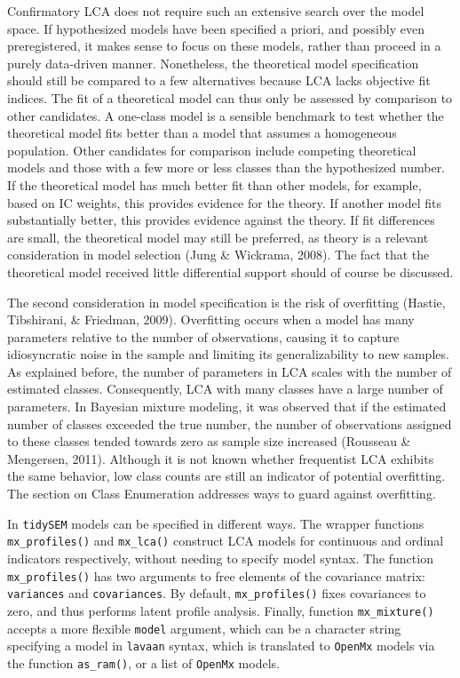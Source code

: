 \documentclass[
  ,man,floatsintext]{apa6}
\begin{document}
Confirmatory LCA does not require such an extensive search over the model space.
If hypothesized models have been specified a priori,
and possibly even preregistered,
it makes sense to focus on these models, rather than proceed in a purely data-driven manner.
Nonetheless, the theoretical model specification should still be compared to a few alternatives because LCA lacks objective fit indices.
The fit of a theoretical model can thus only be assessed by comparison to other candidates.
A one-class model is a sensible benchmark
to test whether the theoretical model fits better than a model that assumes a homogeneous population.
Other candidates for comparison include competing theoretical models and those with a few more or less classes than the hypothesized number.
If the theoretical model has much better fit than other models,
for example, based on IC weights,
this provides evidence for the theory.
If another model fits substantially better,
this provides evidence against the theory.
If fit differences are small, the theoretical model may still be preferred, as theory is a relevant consideration in model selection (Jung \& Wickrama, 2008).
The fact that the theoretical model received little differential support should of course be discussed.

The second consideration in model specification is the risk of overfitting (Hastie, Tibshirani, \& Friedman, 2009).
Overfitting occurs when a model has many parameters relative to the number of observations,
causing it to capture idiosyncratic noise in the sample and limiting its generalizability to new samples.
As explained before, the number of parameters in LCA scales with the number of estimated classes.
Consequently, LCA with many classes have a large number of parameters.
In Bayesian mixture modeling,
it was observed that if the estimated number of classes exceeded the true number, the number of observations assigned to these classes tended towards zero as sample size increased (Rousseau \& Mengersen, 2011).
Although it is not known whether frequentist LCA exhibits the same behavior,
low class counts are still an indicator of potential overfitting.
The section on Class Enumeration addresses ways to guard against overfitting.

In \texttt{tidySEM} models can be specified in different ways.
The wrapper functions \texttt{mx\_profiles()} and \texttt{mx\_lca()} construct LCA models for continuous and ordinal indicators respectively, without needing to specify model syntax.
The function \texttt{mx\_profiles()} has two arguments to free elements of the covariance matrix: \texttt{variances} and \texttt{covariances}.
By default, \texttt{mx\_profiles()} fixes covariances to zero, and thus performs latent profile analysis.
Finally, function \texttt{mx\_mixture()} accepts a more flexible \texttt{model} argument, which can be a character string specifying a model in \texttt{lavaan} syntax,
which is translated to \texttt{OpenMx} models via the function \texttt{as\_ram()},
or a list of \texttt{OpenMx} models.
\end{document}
